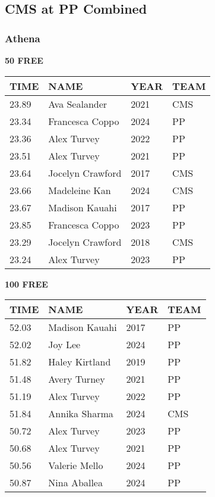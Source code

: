 
\newpage

\subsection{CMS at PP Combined}
\subsubsection{Athena}

\begin{table}[H]
\centering
\begin{minipage}[t]{0.48\textwidth}
\centering
\textbf{50 FREE}\\[0.1cm]
\begin{tabular}{@{}p{1.8cm}p{2.8cm}p{1.2cm}p{1.4cm}@{}}
\hline
    \textbf{TIME} & \textbf{NAME} & \textbf{YEAR} & \textbf{TEAM} \\
\hline
    23.89 & Ava Sealander & 2021 & CMS \\
    23.34 & Francesca Coppo & 2024 & PP \\
    23.36 & Alex Turvey & 2022 & PP \\
    23.51 & Alex Turvey & 2021 & PP \\
    23.64 & Jocelyn Crawford & 2017 & CMS \\
    23.66 & Madeleine Kan & 2024 & CMS \\
    23.67 & Madison Kauahi & 2017 & PP \\
    23.85 & Francesca Coppo & 2023 & PP \\
    23.29 & Jocelyn Crawford & 2018 & CMS \\
    23.24 & Alex Turvey & 2023 & PP \\
\hline
\end{tabular}
\end{minipage}\hfill
\begin{minipage}[t]{0.48\textwidth}
\centering
\textbf{100 FREE}\\[0.1cm]
\begin{tabular}{@{}p{1.8cm}p{2.8cm}p{1.2cm}p{1.4cm}@{}}
\hline
    \textbf{TIME} & \textbf{NAME} & \textbf{YEAR} & \textbf{TEAM} \\
\hline
    52.03 & Madison Kauahi & 2017 & PP \\
    52.02 & Joy Lee & 2024 & PP \\
    51.82 & Haley Kirtland & 2019 & PP \\
    51.48 & Avery Turney & 2021 & PP \\
    51.19 & Alex Turvey & 2022 & PP \\
    51.84 & Annika Sharma & 2024 & CMS \\
    50.72 & Alex Turvey & 2023 & PP \\
    50.68 & Alex Turvey & 2021 & PP \\
    50.56 & Valerie Mello & 2024 & PP \\
    50.87 & Nina Aballea & 2024 & PP \\
\hline
\end{tabular}
\end{minipage}
\end{table}

